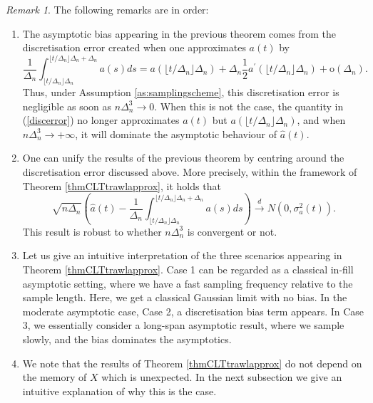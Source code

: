 \documentclass{article}
\theoremstyle{plain}
\theoremstyle{definition}
\theoremstyle{remark}
\newtheorem{remark}{Remark}[section]
\begin{document}
\begin{remark}\label{rmkdiscerror} The following remarks are in order:
	\begin{enumerate}

		\item The asymptotic bias appearing in the previous theorem comes from the discretisation error created when one approximates $a(t)$ by
		\begin{equation}
			\frac{1}{\Delta_{n}}\int_{\lfloor t/\Delta_{n}\rfloor\Delta_{n}}^{\lfloor t/\Delta_{n}\rfloor\Delta_{n}+\Delta_{n}}a(s)ds=a(\lfloor t/\Delta_{n}\rfloor\Delta_{n})+\Delta_{n}\frac{1}{2}a^\prime(\lfloor t/\Delta_{n}\rfloor\Delta_{n})+\mathrm{o}(\Delta_{n}).\label{discerror} 
		\end{equation} 
		Thus, under Assumption \ref{as:samplingscheme}, this discretisation error is negligible as soon as $n\Delta_{n}^3\rightarrow0$. When this is not the case, the quantity in (\ref{discerror}) no longer approximates $a(t)$ but $a(\lfloor t/\Delta_{n}\rfloor\Delta_{n})$, and when $n\Delta_{n}^3\rightarrow+\infty$, it will dominate the asymptotic behaviour of $\hat{a}(t)$.
		\item One can unify the results of the previous theorem by centring around the discretisation error discussed above. More precisely, within the framework of Theorem \ref{thmCLTtrawlapprox}, it holds that
		\[
		\sqrt{n\Delta_{n}}\left(\hat{a}(t)- \frac{1}{\Delta_{n}}\int_{\lfloor t/\Delta_{n}\rfloor\Delta_{n}}^{\lfloor t/\Delta_{n}\rfloor\Delta_{n}+\Delta_{n}}a(s)ds\right)\overset{d}{\rightarrow}N(0,\sigma_{a}^{2}(t)).
		\]
		This result is robust to whether $n\Delta_{n}^3$ is convergent or not.
        \item Let us give an intuitive interpretation of the three scenarios appearing in Theorem \ref{thmCLTtrawlapprox}. Case 1 can be regarded as a classical in-fill asymptotic setting, where we have a fast sampling frequency relative to the sample length. Here, we get a classical Gaussian limit with no bias. In the moderate asymptotic case, Case 2, a discretisation bias term appears. In Case 3, we essentially consider a long-span asymptotic result, where we sample slowly, and the bias dominates the asymptotics. 

  \item We note that the results of  Theorem \ref{thmCLTtrawlapprox} do not depend on the memory of $X$ which is unexpected. In the next subsection we give an intuitive explanation of why this is the case. 
	\end{enumerate}
	
\end{remark} 
\end{document}
